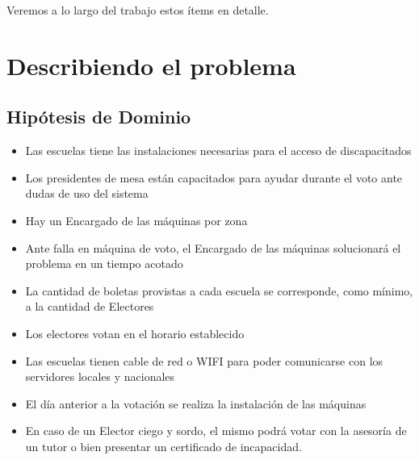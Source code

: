 \documentclass[spanish, 10pt,a4paper]{article}
\numberwithin{equation}{section} %
\begin{document}
	Veremos a lo largo del trabajo estos ítems en detalle.
	
\newpage
\section{Describiendo el problema}

\subsection{Hipótesis de Dominio}
\begin{itemize}
\item Las escuelas tiene las instalaciones necesarias para el acceso de discapacitados
\item Los presidentes de mesa están capacitados para ayudar durante el voto ante dudas de uso del sistema
\item Hay un Encargado de las máquinas por zona
\item Ante falla en máquina de voto, el Encargado de las máquinas solucionará el problema en un tiempo acotado
\item La cantidad de boletas provistas a cada escuela se corresponde, como mínimo, a la cantidad de Electores
\item Los electores votan en el horario establecido
\item Las escuelas tienen cable de red o WIFI para poder comunicarse con los servidores locales y nacionales
\item El día anterior a la votación se realiza la instalación de las máquinas 
\item En caso de un Elector ciego y sordo, el mismo podrá votar con la asesoría de un tutor o bien presentar un certificado de incapacidad.
\end{itemize}
\end{document}

